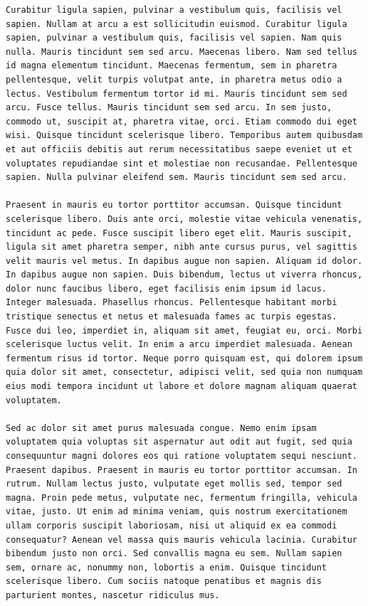 \documentclass[a4paper, 12pt]{article}
\begin{document}
\begin{verbatim}
Curabitur ligula sapien, pulvinar a vestibulum quis, facilisis vel sapien. Nullam at arcu a est sollicitudin euismod. Curabitur ligula sapien, pulvinar a vestibulum quis, facilisis vel sapien. Nam quis nulla. Mauris tincidunt sem sed arcu. Maecenas libero. Nam sed tellus id magna elementum tincidunt. Maecenas fermentum, sem in pharetra pellentesque, velit turpis volutpat ante, in pharetra metus odio a lectus. Vestibulum fermentum tortor id mi. Mauris tincidunt sem sed arcu. Fusce tellus. Mauris tincidunt sem sed arcu. In sem justo, commodo ut, suscipit at, pharetra vitae, orci. Etiam commodo dui eget wisi. Quisque tincidunt scelerisque libero. Temporibus autem quibusdam et aut officiis debitis aut rerum necessitatibus saepe eveniet ut et voluptates repudiandae sint et molestiae non recusandae. Pellentesque sapien. Nulla pulvinar eleifend sem. Mauris tincidunt sem sed arcu.

Praesent in mauris eu tortor porttitor accumsan. Quisque tincidunt scelerisque libero. Duis ante orci, molestie vitae vehicula venenatis, tincidunt ac pede. Fusce suscipit libero eget elit. Mauris suscipit, ligula sit amet pharetra semper, nibh ante cursus purus, vel sagittis velit mauris vel metus. In dapibus augue non sapien. Aliquam id dolor. In dapibus augue non sapien. Duis bibendum, lectus ut viverra rhoncus, dolor nunc faucibus libero, eget facilisis enim ipsum id lacus. Integer malesuada. Phasellus rhoncus. Pellentesque habitant morbi tristique senectus et netus et malesuada fames ac turpis egestas. Fusce dui leo, imperdiet in, aliquam sit amet, feugiat eu, orci. Morbi scelerisque luctus velit. In enim a arcu imperdiet malesuada. Aenean fermentum risus id tortor. Neque porro quisquam est, qui dolorem ipsum quia dolor sit amet, consectetur, adipisci velit, sed quia non numquam eius modi tempora incidunt ut labore et dolore magnam aliquam quaerat voluptatem.

Sed ac dolor sit amet purus malesuada congue. Nemo enim ipsam voluptatem quia voluptas sit aspernatur aut odit aut fugit, sed quia consequuntur magni dolores eos qui ratione voluptatem sequi nesciunt. Praesent dapibus. Praesent in mauris eu tortor porttitor accumsan. In rutrum. Nullam lectus justo, vulputate eget mollis sed, tempor sed magna. Proin pede metus, vulputate nec, fermentum fringilla, vehicula vitae, justo. Ut enim ad minima veniam, quis nostrum exercitationem ullam corporis suscipit laboriosam, nisi ut aliquid ex ea commodi consequatur? Aenean vel massa quis mauris vehicula lacinia. Curabitur bibendum justo non orci. Sed convallis magna eu sem. Nullam sapien sem, ornare ac, nonummy non, lobortis a enim. Quisque tincidunt scelerisque libero. Cum sociis natoque penatibus et magnis dis parturient montes, nascetur ridiculus mus.


\end{verbatim}
\end{document}
